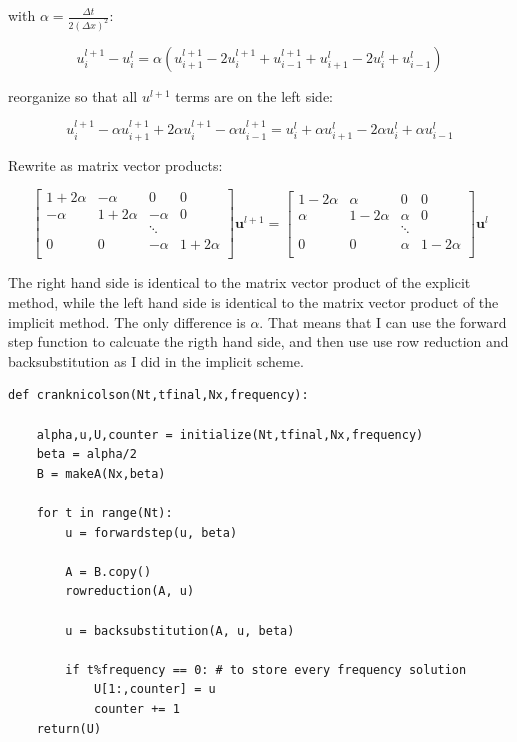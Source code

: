 \documentclass{article}
\begin{document}
with $\alpha =  \frac{\Delta t} {2(\Delta x)^2}$:

\begin{equation*}
u_i^{l+1}-u_i^l = \alpha(u_{i+1}^{l+1}-2u_i^{l+1}+u_{i-1}^{l+1} + u_{i+1}^{l}-2u_i^{l}+u_{i-1}^{l} )
\end{equation*}

reorganize so that all $u^{l+1}$ terms are on the left side:

\begin{equation*}
u_i^{l+1} - \alpha u_{i+1}^{l+1} + 2\alpha u_i^{l+1}- \alpha u_{i-1}^{l+1} = u_i^l+  \alpha u_{i+1}^{l}-2\alpha u_i^{l}+ \alpha u_{i-1}^{l} 
\end{equation*}

Rewrite as matrix vector products:

\begin{equation*}
\begin{bmatrix}
1+2\alpha & -\alpha & 0 & 0 \\
-\alpha & 1+2\alpha & -\alpha & 0 \\
 &  & \ddots  &  \\
0 & 0 & -\alpha & 1+2\alpha \\
\end{bmatrix}
\bm{u}^{l+1}
=
\begin{bmatrix}
1-2\alpha & \alpha & 0 & 0 \\
\alpha & 1-2\alpha & \alpha & 0 \\
 &  & \ddots  &  \\
0 & 0 & \alpha & 1-2\alpha \\
\end{bmatrix}
\bm{u}^{l}
\end{equation*}

The right hand side is identical to the matrix vector product of the explicit method, while the left hand side is identical to the matrix vector product of the implicit method. The only difference is $\alpha$.  That means that I can use the forward step function to calcuate the rigth hand side, and then use use row reduction and backsubstitution as I did in the implicit scheme. 

\begin{verbatim}
def cranknicolson(Nt,tfinal,Nx,frequency): 

    alpha,u,U,counter = initialize(Nt,tfinal,Nx,frequency)
    beta = alpha/2
    B = makeA(Nx,beta)

    for t in range(Nt):
        u = forwardstep(u, beta)

        A = B.copy()
        rowreduction(A, u)

        u = backsubstitution(A, u, beta)

        if t%frequency == 0: # to store every frequency solution
            U[1:,counter] = u
            counter += 1
    return(U)
\end{verbatim}
\end{document}
